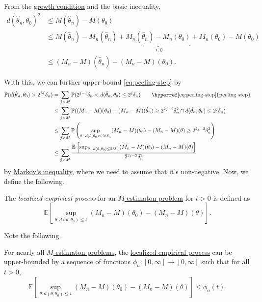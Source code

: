 \begin{note}
	From the \hyperref[def:growth-condition*]{growth condition} and the basic inequality,
	\[
		\begin{split}
			d(\hat{\theta} _n, \theta _0)^2
			&\leq M(\hat{\theta} _n ) - M(\theta _0)\\
			&\leq M(\hat{\theta} _n) - M_n(\hat{\theta} _n) + \underbrace{M_n(\hat{\theta} _n) - M_n(\theta _0)}_{\leq 0} + M_n(\theta _0) - M(\theta _0)\\
			&\leq (M_n - M)(\hat{\theta} _n) - (M_n - M)(\theta _0).
		\end{split}
	\]
\end{note}

With this, we can further upper-bound \autoref{eq:peeling-step} by
\begin{align*}
	\mathbb{P} (d(\hat{\theta} _n, \theta _0) > 2^M \delta _n)
	 & = \sum_{j > M} \mathbb{P} (2^{j-1} \delta _n < d(\hat{\theta} _n, \theta _0) \leq 2^j \delta _n)\tag*{\hyperref[eq:peeling-step]{peeling step}}                                        \\
	 & \leq \sum_{j > M} \mathbb{P} ((M_n - M)(\theta _0) - (M_n - M)(\hat{\theta} _n) \geq 2^{2j-2} \delta _n^2 \cap d(\hat{\theta} _n, \theta _0) \leq 2^j \delta _n)                       \\
	 & \leq \sum_{j > M} \mathbb{P} \left( \sup _{\theta \colon d(\theta , \theta _0) \leq 2^j \delta _n} (M_n - M)(\theta _0) - (M_n - M)(\theta ) \geq 2^{2j - 2} \delta _n^2 \right)       \\
	 & \leq \sum_{j > M} \frac{\mathbb{E}_{}\left[\sup _{\theta \colon d(\theta , \theta _0) \leq 2^j \delta _n} (M_n - M)(\theta _0) - (M_n - M)(\theta ) \right] }{2^{2j - 2} \delta _n^2 }
\end{align*}
by \hyperref[lma:Markov-inequality]{Markov's  inequality}, where we need to assume that it's non-negative. Now, we define the following.

\begin{definition}\label{def:localized-EP}
	The \emph{localized empirical process} for an \hyperref[prb:M-estimation]{\(M\)-estimaton problem} for \(t > 0\) is defined as
	\[
		\mathbb{E}_{}\left[\sup _{\theta \colon d(\theta , \theta _0) \leq t} (M_n - M)(\theta _0) - (M_n - M)(\theta ) \right].
	\]
\end{definition}

Note the following.

\begin{note}
	For nearly all \hyperref[prb:M-estimation]{\(M\)-estimaton problems}, the \hyperref[def:localized-EP]{localized empirical process} can be upper-bounded by a sequence of functions \(\phi _n\colon [0, \infty ] \to [0, \infty ]\) such that for all \(t > 0\),
	\[
		\mathbb{E}_{}\left[\sup _{\theta \colon d(\theta , \theta _0) \leq t} (M_n - M)(\theta _0) - (M_n - M)(\theta ) \right] \leq \phi _n(t).
	\]
\end{note}

